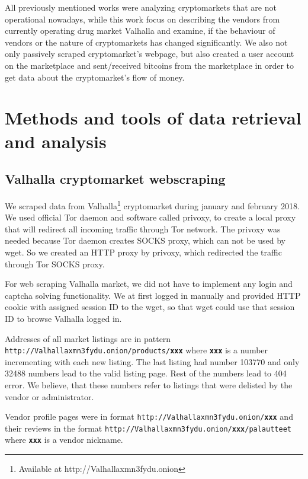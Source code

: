 \documentclass[
  digital, %
  table,   %
  lof,     %
  lot,     %
  oneside
]{fithesis3}
\begin{document}
 All previously mentioned works were analyzing cryptomarkets that are not operational nowadays,
 while this work focus on describing the vendors from currently operating drug market Valhalla 
 and examine, if the behaviour of vendors or the nature of cryptomarkets
 has changed significantly. We also not only passively scraped cryptomarket's webpage,
 but also created a user account on the marketplace and sent/received bitcoins from the marketplace
 in order to get data about the cryptomarket's flow of money.
 
\chapter{Methods and tools of data retrieval and analysis}

\section{Valhalla cryptomarket webscraping}
We scraped data from Valhalla\footnote{Available at http://Valhallaxmn3fydu.onion} cryptomarket
during january and february 2018. 
We used official Tor daemon and software called privoxy, to create a local proxy that will redirect all
incoming traffic through Tor network. The privoxy was needed because Tor daemon creates SOCKS proxy,
which can not be used by wget. So we created an HTTP proxy by privoxy,
which redirected the traffic through Tor SOCKS proxy.

For web scraping Valhalla market,
we did not have to implement any login and captcha solving functionality.
We at first logged in manually and provided HTTP cookie with assigned session ID to the wget,
so that wget could use that session ID to browse Valhalla logged in.

Addresses of all market listings are in pattern\newline
\texttt{http://Valhallaxmn3fydu.onion/products/\textbf{xxx}} where \texttt{\textbf{xxx}}
is a number incrementing with each new listing.
The last listing had number 103770 and only 32488 numbers lead to the valid listing page.
Rest of the numbers lead to 404 error. We believe,
that these numbers refer to listings that were delisted by the vendor or administrator.

Vendor profile pages were in format \texttt{http://Valhallaxmn3fydu.onion/\textbf{xxx}}
and their reviews in the format
 \texttt{http://Valhallaxmn3fydu.onion/\textbf{xxx}/palautteet} where \texttt{\textbf{xxx}}
is a vendor nickname. 
 
\end{document}
